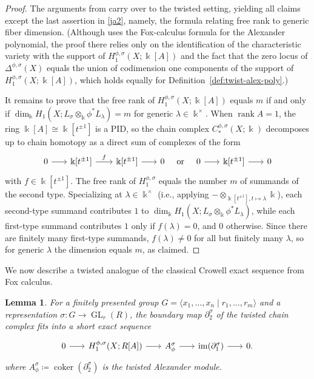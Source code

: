 \documentclass[11pt]{amsart}
\newtheorem{lemma}[theorem]{Lemma}
\theoremstyle{definition}
\renewcommand{\k}{\Bbbk}
\DeclareMathOperator{\rank}{rank}
\DeclareMathOperator{\im}{im}
\DeclareMathOperator{\coker}{coker}
\DeclareMathOperator{\GL}{GL}
\begin{document}
\begin{proof}
The arguments from \cite[Cor.~3.2]{DPS-imrn} carry over to the twisted 
setting, yielding all claims except the last assertion in \eqref{ja2}, namely, 
the formula relating free rank to generic fiber dimension.
(Although \cite{DPS-imrn} uses the Fox-calculus formula for the Alexander 
polynomial, the proof there relies only on the identification of the 
characteristic variety with the support of $H_1^{\phi,\sigma}(X;\k[A])$ 
and the fact that the zero locus of $\Delta^{\phi,\sigma}(X)$ 
equals the union of codimension one components of the support of $H_1^{\phi,\sigma}(X;\k[A])$,
which holds equally for Definition~\ref{def:twist-alex-poly}.)

It remains to prove that the free rank of $H_1^{\phi,\sigma}(X;\k[A])$ 
equals $m$ if and only if $\dim_\k H_1(X; L_\sigma\otimes_\k\phi^*L_\lambda)=m$ 
for generic $\lambda\in\k^\times$.
When $\rank A=1$, the ring $\k[A]\cong \k[t^{\pm1}]$ is a PID, 
so the chain complex $C_*^{\phi,\sigma}(X;\k)$ decomposes up to 
chain homotopy as a direct sum of complexes of the form
\[
\begin{tikzcd}[column sep=18pt]
0 \ar[r]& \k[t^{\pm1}] \ar[r, "f"] &[2pt] \k[t^{\pm1}] \ar[r]& 0
\end{tikzcd}
\quad\text{or}\quad
\begin{tikzcd}[column sep=18pt]
0 \ar[r]& \k[t^{\pm1}] \ar[r]& 0
\end{tikzcd}
\]
with $f\in \k[t^{\pm1}]$.  The free rank of $H_1^{\phi,\sigma}$ equals
the number $m$ of summands of the second type.  Specializing at
$\lambda\in\k^\times$ (i.e., applying $-\otimes_{\k[t^{\pm1}],t\mapsto\lambda}\k$),
each second-type summand contributes $1$ to 
$\dim_\k H_1(X;L_\sigma\otimes_\k\phi^*L_\lambda)$, while each first-type 
summand contributes $1$ only if $f(\lambda)=0$, and $0$ otherwise.
Since there are finitely many first-type summands, $f(\lambda)\ne 0$ 
for all but finitely many $\lambda$, so for generic $\lambda$ the 
dimension equals $m$, as claimed.
\end{proof}

We now describe a twisted analogue of the classical Crowell exact 
sequence from Fox calculus.

\begin{lemma}
\label{lem:twisted-crowell}
For a finitely presented group $G=\langle x_1,\dots,x_n\mid r_1,\dots,r_m\rangle$ 
and a representation $\sigma\colon G\to\GL_r(R)$, the boundary map 
$\partial_2^\sigma$ of the twisted chain complex fits into a short exact sequence
\begin{equation}
\label{eq:crowell}
\begin{tikzcd}[column sep=18pt]
0 \ar[r] & H_1^{\phi,\sigma}(X;R[A]) \ar[r] &A_\phi^\sigma 
\ar[r] & \im(\partial_1^\sigma) \ar[r] & 0.
\end{tikzcd}
\end{equation}
where $A_\phi^\sigma \coloneqq \coker(\partial_2^\sigma)$ is the 
\emph{twisted Alexander module}.
\end{lemma}
\end{document}
